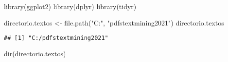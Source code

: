 \documentclass[
]{book}
\newenvironment{Shaded}{\begin{snugshade}}{\end{snugshade}}
\newcommand{\FunctionTok}[1]{\textcolor[rgb]{0.00,0.00,0.00}{#1}}
\newcommand{\NormalTok}[1]{#1}
\newcommand{\OtherTok}[1]{\textcolor[rgb]{0.56,0.35,0.01}{#1}}
\newcommand{\StringTok}[1]{\textcolor[rgb]{0.31,0.60,0.02}{#1}}
\begin{document}
\begin{Shaded}
\begin{Highlighting}[]
\FunctionTok{library}\NormalTok{(ggplot2)}
\FunctionTok{library}\NormalTok{(dplyr)}
\FunctionTok{library}\NormalTok{(tidyr)}
\end{Highlighting}
\end{Shaded}

\begin{Shaded}
\begin{Highlighting}[]
\NormalTok{directorio.textos }\OtherTok{\textless{}{-}} \FunctionTok{file.path}\NormalTok{(}\StringTok{"C:"}\NormalTok{, }\StringTok{"pdfstextmining2021"}\NormalTok{)}
\NormalTok{directorio.textos}
\end{Highlighting}
\end{Shaded}

\begin{verbatim}
## [1] "C:/pdfstextmining2021"
\end{verbatim}

\begin{Shaded}
\begin{Highlighting}[]
\FunctionTok{dir}\NormalTok{(directorio.textos)}
\end{Highlighting}
\end{Shaded}
\end{document}
